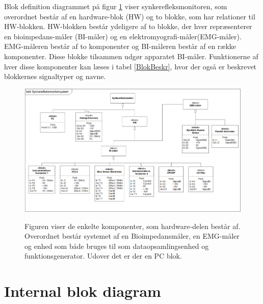 Blok definition diagrammet på figur \ref{figbdd} viser synkerefleksmonitoren, som overordnet består af en hardware-blok (HW) og to blokke, som har relationer til HW-blokken. HW-blokken består ydeligere af to blokke, der hver repræsenterer en bioimpedans-måler (BI-måler) og en elektromyografi-måler(EMG-måler). EMG-måleren består af to komponenter og BI-måleren består af en række komponenter. Disse blokke tilsammen udgør apparatet BI-måler.  Funktionerne af hver disse komponenter kan læses i tabel \ref{BlokBeskr}, hvor der også er beskrevet blokkernes signaltyper og navne.  

\begin{figure}[H] 
\centering
{\includegraphics[width=\linewidth]
{Figure/BDD}}
\caption{Figuren viser de enkelte komponenter, som hardware-delen består af. Overordnet består systemet af en Bioimpedansmåler, en EMG-måler og enhed som både bruges til som dataopsamlingsenhed og funktionsgenerator. Udover det er der en PC blok.}
\label{figbdd}
\end{figure}

\section{Internal blok diagram}

